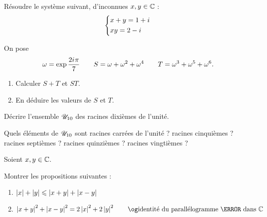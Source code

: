 \begin{exo}[Exercice 5]
Résoudre le système suivant, d'inconnues \(x,y\in\mathbb{C}\) : \[\begin{dcases}x+y=1+i\mkern1mu \\ xy=2-i\mkern1mu\end{dcases}\]
\end{exo}

\begin{corr}
\end{corr}

\begin{exo}
On pose \[\omega=\exp\dfrac{2i\mkern1mu\pi}{7}\qquad S=\omega+\omega^2+\omega^4\qquad T=\omega^3+\omega^5+\omega^6.\]

\begin{enumerate}
\item Calculer \(S+T\) et \(ST\). \\

\item En déduire les valeurs de \(S\) et \(T\).
\end{enumerate}
\end{exo}

\begin{corr}
\end{corr}

\begin{exo}[Exercice 7]
Décrire l'ensemble \(\mathscr{U}_{10}\) des racines dixièmes de l'unité.

Quels éléments de \(\mathscr{U}_{10}\) sont racines carrées de l'unité ? racines cinquièmes ? racines septièmes ? racines quinzièmes ? racines vingtièmes ?
\end{exo}

\begin{corr}
\end{corr}

\begin{exo}[Exercice 8]
Soient \(x,y\in\mathbb{C}\).

Montrer les propositions suivantes :

\begin{enumerate}
\item \(\left\lvert x\right\rvert+\left\lvert y\right\rvert\leqslant\left\lvert x+y\right\rvert+\left\lvert x-y\right\rvert\) \\

\item \(\abs{x+y}^2+\abs{x-y}^2=2\abs{x}^2+2\abs{y}^2\qquad\text{\guillemets{identité du parallélogramme} dans }\C\)
\end{enumerate}
\end{exo}

